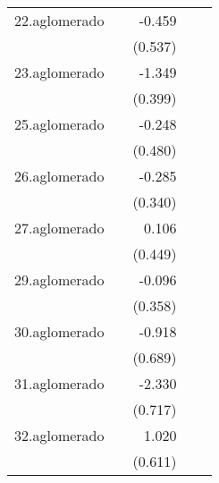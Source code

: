 {\begin{longtable}{l*{4}{D{.}{.}{-1}}}
\addlinespace
22.aglomerado&                     &      -0.459         &                     &                     \\
            &                     &     (0.537)         &                     &                     \\
\addlinespace
23.aglomerado&                     &      -1.349\sym{***}&                     &                     \\
            &                     &     (0.399)         &                     &                     \\
\addlinespace
25.aglomerado&                     &      -0.248         &                     &                     \\
            &                     &     (0.480)         &                     &                     \\
\addlinespace
26.aglomerado&                     &      -0.285         &                     &                     \\
            &                     &     (0.340)         &                     &                     \\
\addlinespace
27.aglomerado&                     &       0.106         &                     &                     \\
            &                     &     (0.449)         &                     &                     \\
\addlinespace
29.aglomerado&                     &      -0.096         &                     &                     \\
            &                     &     (0.358)         &                     &                     \\
\addlinespace
30.aglomerado&                     &      -0.918         &                     &                     \\
            &                     &     (0.689)         &                     &                     \\
\addlinespace
31.aglomerado&                     &      -2.330\sym{**} &                     &                     \\
            &                     &     (0.717)         &                     &                     \\
\addlinespace
32.aglomerado&                     &       1.020         &                     &                     \\
            &                     &     (0.611)         &                     &                     \\

\end{longtable}}

